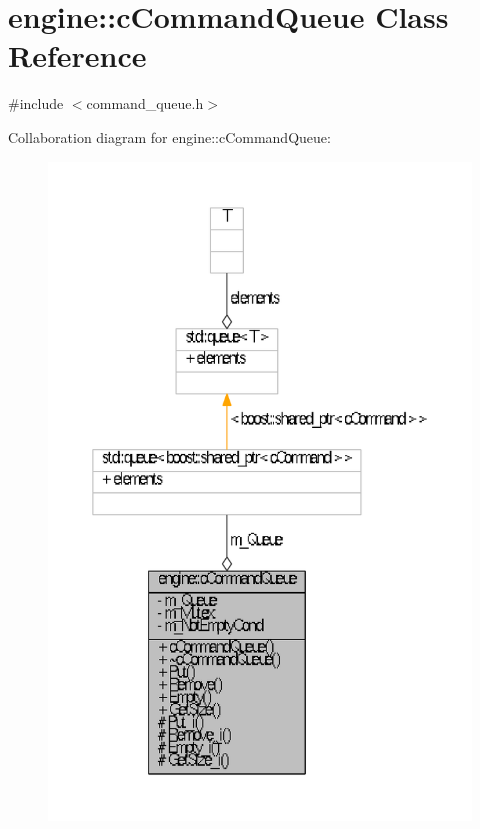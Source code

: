 \hypertarget{classengine_1_1cCommandQueue}{\section{engine\-:\-:c\-Command\-Queue \-Class \-Reference}
\label{classengine_1_1cCommandQueue}
}


{\ttfamily \#include $<$command\-\_\-queue.\-h$>$}



\-Collaboration diagram for engine\-:\-:c\-Command\-Queue\-:
\nopagebreak
\begin{figure}[H]
\begin{center}
\leavevmode
\includegraphics[width=350pt]{classengine_1_1cCommandQueue__coll__graph}
\end{center}
\end{figure}
